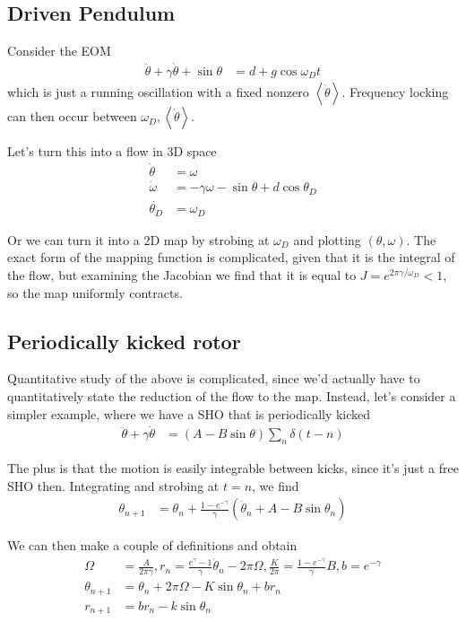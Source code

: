 \documentclass[12pt]{article}
\newcommand{\expvalue}[1]{\left<#1\right>}
\begin{document}
\subsection{Driven Pendulum}

Consider the EOM
\begin{align}
    \ddot{\theta} + \gamma\dot{\theta} + \sin\theta &= d + g \cos \omega_D t
\end{align}
which is just a running oscillation with a fixed nonzero
$\expvalue{\dot{\theta}}$. Frequency locking can then occur between $\omega_D,
\expvalue{\dot{\theta}}$.

Let's turn this into a flow in 3D space
\begin{align}
    \dot{\theta} &= \omega\\
    \dot{\omega} &= -\gamma \omega - \sin\theta + d\cos\theta_D\\
    \dot{\theta_D} &= \omega_D
\end{align}

Or we can turn it into a 2D map by strobing at $\omega_D$ and plotting
$(\theta,\omega)$. The exact form of the mapping function is complicated, given
that it is the integral of the flow, but examining the Jacobian we find that it
is equal to $J = e^{2\pi \gamma/\omega_D} < 1$, so the map uniformly contracts.

\subsection{Periodically kicked rotor}

Quantitative study of the above is complicated, since we'd actually have to
quantitatively state the reduction of the flow to the map. Instead, let's
consider a simpler example, where we have a SHO that is periodically kicked
\begin{align}
    \ddot{\theta} + \gamma\dot{\theta} &=
    (A - B\sin\theta)\sum\limits_{n}^{}\delta(t-n)
\end{align}

The plus is that the motion is easily integrable between kicks, since it's just
a free SHO then. Integrating and strobing at $t=n$, we find
\begin{align}
    \theta_{n+1} &= \theta_n + \frac{1 - e^{-\gamma}}{\gamma}
        \left( \dot{\theta}_n + A - B\sin\theta_n \right)
\end{align}

We can then make a couple of definitions and obtain
\begin{align}
    \Omega &= \frac{A}{2\pi \gamma},
    r_n = \frac{e^\gamma - 1}{\gamma} \dot{\theta}_n - 2\pi \Omega,
    \frac{K}{2\pi} = \frac{1 - e^{-\gamma}}{\gamma}B,
    b = e^{-\gamma}\\
    \theta_{n+1} &= \theta_n + 2\pi \Omega - K\sin \theta_n + br_n\\
    r_{n+1} &= br_n - k\sin \theta_n
\end{align}
\end{document}
